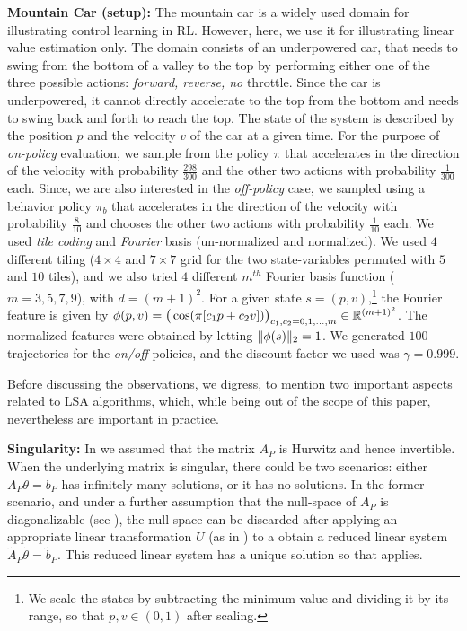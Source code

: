 \textbf{Mountain Car (setup):}  The mountain car is a widely used domain for illustrating control learning in RL.
However, here, we use it for illustrating linear value estimation only. The domain consists of an underpowered car, that needs to swing from the bottom of a valley to the top by performing either one of the three possible actions: \emph{forward, reverse, no} throttle. Since the car is underpowered, it cannot directly accelerate to the top from the bottom and needs to swing back and forth to reach the top. The state of the system is described by the position $p$ and the velocity $v$ of the car at a given time. For the purpose of \emph{on-policy} evaluation, we sample from the policy $\pi$ that accelerates in the direction of the velocity with probability $\frac{298}{300}$ and the other two actions with probability $\frac{1}{300}$ each. Since, we are also interested in the \emph{off-policy} case, we sampled using a behavior policy $\pi_b$ that accelerates in the direction of the velocity with probability $\frac{8}{10}$ and chooses the other two actions with probability $\frac{1}{10}$ each. We used \emph{tile coding} and \emph{Fourier} basis (un-normalized and normalized). We used $4$ different tiling ($4\times 4$ and $7\times 7$ grid for the two state-variables permuted with $5$ and $10$ tiles), and we also tried $4$ different $m^{th}$ Fourier basis function ($m=3,5,7,9$), with $d=(m+1)^2$. For a given state $s=(p,v)$,\footnote{We scale the states by subtracting the minimum value and dividing it by its range, so that $p,v\in(0,1)$ after scaling.} the Fourier feature is given by $\phi(p,v)=\big(\cos(\pi [c_1p+c_2 v])\big)_{c_1,c_2=0,1,\ldots,m} \in \mathbb{R}^{(m+1)^2}$. The normalized features were obtained by letting $\| \phi(s)\|_2=1$. We generated $100$ trajectories for the \emph{on/off}-policies, and the discount factor we used was $\gamma=0.999$. 

Before discussing the observations, we digress, to mention two important aspects related to LSA algorithms, which, while being out of the scope of this paper, nevertheless are important in practice.

\textbf{Singularity:} In  we assumed that the matrix $A_P$ is Hurwitz and hence invertible. When the underlying matrix is singular, there could be two scenarios: either $A_P\theta=b_P$ has infinitely many solutions, or it has no solutions. In the former scenario, and under a further assumption that the null-space of $A_P$ is diagonalizable (see \cite{bertstab}), the null space can be discarded after applying an appropriate linear transformation $U$ (as in ) to a obtain a reduced linear system $\tilde{A}_P\tilde{\theta}=\tilde{b}_P$. This reduced linear system has a unique solution so that  applies.

